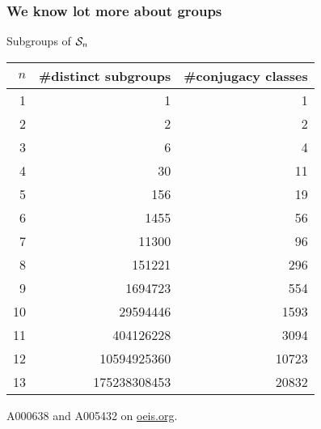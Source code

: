\documentclass{beamer}
\newcommand{\cS}{{\cal S}}
\begin{document}
\begin{frame}\frametitle{We know lot more about groups}
Subgroups of $\cS_n$

\begin{tabular}{r|r|r}
$n$ & \#distinct subgroups & \#conjugacy classes\\
\hline
1& 1 & 1\\
2& 2&2\\
3& 6&4\\
4& 30&11\\
5& 156&19\\
6& 1455&56\\
7& 11300&96\\
8& 151221&296\\
9& 1694723&554\\
10& 29594446&1593\\
11& 404126228&3094\\
12& 10594925360&10723\\
13& 175238308453&20832
\end{tabular}

A000638 and A005432 on \url{oeis.org}.
\end{frame}
\end{document}

